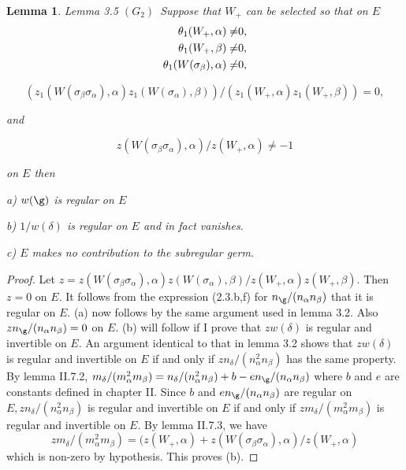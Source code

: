 \documentclass{memo-l}
\newtheorem{lemma}[theorem]{Lemma}
\theoremstyle{definition}
\theoremstyle{remark}
\numberwithin{section}{chapter}
\numberwithin{equation}{chapter}
\begin{document}
\begin{lemma}{Lemma 3.5}  $(G_{2})$\  Suppose that $W_{+}$ can be selected so that on 
$E$  
$$\aligned 
{\theta}_{1}(W_{+},{\alpha})\ne& 0, \\
{\theta}_{1}(W_{+},{\beta})\ne &0, \\ 
{\theta}_{1}(W({\sigma}_{\beta}),{\alpha})\ne& 0,
\endaligned$$

$$(z_{1}(W({\sigma}_{\beta}{\sigma}_{\alpha}),{\alpha})z_{1}
(W({\sigma}_{\alpha}),{\beta}))/(z_{1}(W_{+},{\alpha})z_{1}(W_{+},
{\beta})) = 0,
$$

and

$$
z(W({\sigma}_{\beta}{\sigma}_{\alpha}),{\alpha})/z(W_{+},{\alpha}) \ne  -1
$$ 

on $E$ then

\noindent
a)   $w({\g})$ is regular on $E$

\noindent
b)   $1/w({\delta})$ is regular on $E$ and in fact vanishes.

\noindent
c)   $E$ makes no contribution to the subregular germ.
\end{lemma}

\medskip

\begin{proof}    Let $z = z(W({\sigma}_{\beta}{\sigma}_{\alpha}),
{\alpha})z(W({\sigma}_{\alpha}),{\beta})/z(W_{+},{\alpha})z(W_{+},{\beta})$. 
 Then $z = 0$ on $E$. 
 It follows from the expression (2.3.b,f) for $n_{{\g}}/(n_{\alpha}
n_{\beta})$ that it is regular on $E$. 
(a) now follows by the same argument used in lemma 3.2. 
 Also $zn_{{\g}}/(n_{\alpha}n_{\beta}) = 0$ on $E$. 
(b) will follow if I prove that $zw({\delta})$ is regular and
invertible on $E$. 
 An argument identical to that in lemma 3.2 shows that $zw({\delta})$ is 
regular and invertible on $E$ if and only if $zn_{{\delta}}/(n_{\alpha}^{2}
n_{\beta})$ has the same property. 
 By lemma II.7.2, $m_{{\delta}}/(m_{\alpha}^{2}m_{\beta}) = 
n_{{\delta}}/(n_{\alpha}^{2}n_{\beta}) + b - en_{{\g}}/(n_{\alpha}
n_{\beta})$ where $b$ and $e$ are constants defined in chapter II. 
 Since $b$ and $en_{{\g}}/(n_{\alpha}n_{\beta})$ are regular on $E, 
zn_{{\delta}}/(n_{\alpha}^{2}n_{\beta})$ is regular and invertible on $E$ 
if and only if $zm_{{\delta}}/(m_{\alpha}^{2}m_{\beta})$ is regular and 
invertible on $E$. 
 By lemma II.7.3, we have
$$
zm_{{\delta}}/(m_{\alpha}^{2}m_{\beta}) = (z(W_{+},{\alpha})+
z(W({\sigma}_{\beta}{\sigma}_{\alpha}),{\alpha})/z(W_{+},{\alpha})
$$ 
which is non-zero by hypothesis.  This proves (b).
\end{proof} 
\end{document}
